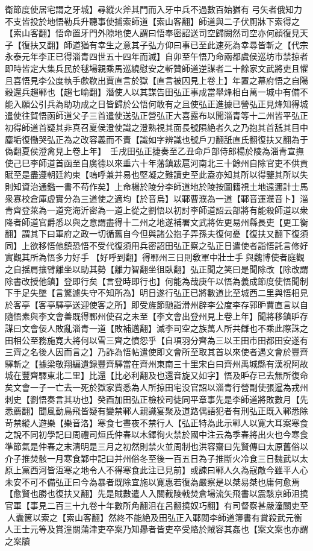 衛節度使居宅謂之牙城】尋縱火斧其門而入牙中兵不過數百始猶有弓矢者俄知力不支皆投於地悟勒兵升聽事使捕索師道【索山客翻】師道與二子伏厠牀下索得之【索山客翻】悟命置牙門外隙地使人謂曰悟奉密詔送司空歸闕然司空亦何顔復見天子【復扶又翻】師道猶有幸生之意其子弘方仰曰事已至此速死為幸尋皆斬之【代宗永泰元年李正已得淄青四世五十四年而滅】自卯至午悟乃命兩都虞侯巡坊市禁掠者即時皆定大集兵民於毬場親乘馬巡繞慰安之斬贊師道逆謀者二十餘家文武將吏且懼且喜悟見李公度執手歔欷出賈直言於獄【直言被囚見上卷上】年置之幕府悟之自陽穀還兵趨鄆也【趨七喻翻】潛使人以其謀告田弘正事成當舉烽相白萬一城中有備不能入願公引兵為助功成之日皆歸於公悟何敢有之且使弘正進據已營弘正見烽知得城遣使往賀悟函師道父子三首遣使送弘正營弘正大喜露布以聞淄青等十二州皆平弘正初得師道首疑其非真召夏侯澄使識之澄熟視其面長號隕絶者久之乃抱其首舐其目中塵垢復慟哭弘正為之改容義而不責【識如字辨識也號戶刀翻舐直氏翻復扶又翻為于偽翻夏侯澄禽見上卷上年】　壬戌田弘正捷奏至乙丑命戶部侍郎楊於陵為淄青宣撫使己巳李師道首函至自廣德以來垂六十年藩鎮跋扈河南北三十餘州自除官吏不供貢賦至是盡遵朝廷約束【嗚呼兼并易也堅凝之難讀史至此盍亦知其所以得鑒其所以失則知資治通鑑一書不苟作矣】上命楊於陵分李師道地於陵按圖籍視土地遠邇計士馬衆寡校倉庫虚實分為三道使之適均【於音烏】以鄆曹濮為一道【鄆音運濮音卜】淄青齊登萊為一道兖海沂密為一道上從之劉悟以初討李師道詔云部將有能殺師道以衆降者師道官爵悉以與之意謂盡得十二州之地遂補署文武將佐更易州縣長吏【更工衡翻】謂其下曰軍府之政一切循舊自今但與諸公抱子弄孫夫復何憂【復扶又翻下復須同】上欲移悟他鎮恐悟不受代復須用兵密詔田弘正察之弘正日遣使者詣悟託言修好實觀其所為悟多力好手【好呼到翻】得鄆州三日則敎軍中壯士手與魏博使者庭觀之自揺肩攘臂離坐以助其勢【離力智翻坐徂臥翻】弘正聞之笑曰是聞除改【除改謂除書改授他鎮】登即行矣【言登時即行也】何能為哉庚午以悟為義成節度使悟聞制下手足失墜【言驚遽失守不知所為】明日遂行弘正已將數道比至城西二里與悟相見於客亭【客亭驛亭送迎使客之所】即受旌節馳詣滑州辟李公度李存郭昈賈直言以自隨悟素與李文會善既得鄆州使召之未至【李文會出登州見上卷上年】聞將移鎮昈存謀曰文會佞人敗亂淄青一道【敗補邁翻】滅李司空之族萬人所共讎也不乘此際誅之田相公至務施寛大將何以雪三齊之憤怨乎【自項羽分齊為三以王田市田都田安遂有三齊之名後人因而言之】乃詐為悟帖遣使即文會所至取其首以來使者遇文會於豐齊驛斬之【據梁敬翔編遺録豐齊驛當在齊州東南三十里宋白曰齊州禹城縣有漢祝阿故城在豐齊驛東北二里】比還【比必利翻及也還音旋又如字】悟及昈存已去無所復命矣文會一子一亡去一死於獄家貲悉為人所掠田宅没官詔以淄青行營副使張暹為戎州刺史【劉悟奏言其功也】癸酉加田弘正檢校司徒同平章事先是李師道將敗數月【先悉薦翻】聞風動鳥飛皆疑有變禁鄆人親識宴聚及道路偶語犯者有刑弘正既入鄆悉除苛禁縱人遊樂【樂音洛】寒食七晝夜不禁行人【弘正特為此示鄆人以寛大耳案寒食之說不同初學記曰周禮司烜氏仲春以木鐸徇火禁於國中注云為季春將出火也今寒食準節氣是仲春之末清明是三月之初然則禁火並周制也洪容齋曰先賢傳曰太原舊俗以介子推焚骸一月寒食鄴中記曰并州俗冬至後一百五日為子推斷火冷食三日魏武以太原上黨西河皆沍寒之地令人不得寒食此注已見前】或諫曰鄆人久為寇敵今雖平人心未安不可不備弘正曰今為暴者既除宜施以寛惠若復為嚴察是以桀易桀也庸何愈焉【愈賢也勝也復扶又翻】先是賊數遣人入關截陵戟焚倉場流矢飛書以震駭京師沮撓官軍【事見二百三十九卷十年數所角翻沮在呂翻撓奴巧翻】有司督察甚嚴潼關吏至人囊篋以索之【索山客翻】然終不能絶及田弘正入鄆閲李師道簿書有賞殺武元衡人王士元等及賞潼關蒲津吏卒案乃知曏者皆吏卒受賂於賊容其姦也【案文案也亦謂之案牘